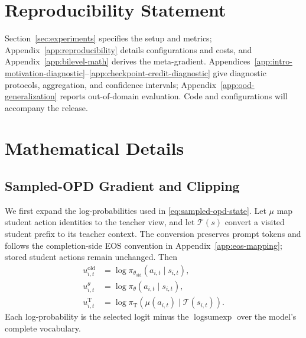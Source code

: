 \documentclass{article}
\theoremstyle{plain}
\theoremstyle{definition}
\theoremstyle{remark}
\begin{document}
\section*{Reproducibility Statement}

Section~\ref{sec:experiments} specifies the setup and metrics; Appendix~\ref{app:reproducibility}
details configurations and costs, and Appendix~\ref{app:bilevel-math} derives the meta-gradient.
Appendices~\ref{app:intro-motivation-diagnostic}--\ref{app:checkpoint-credit-diagnostic}
give diagnostic protocols, aggregation, and confidence intervals;
Appendix~\ref{app:ood-generalization} reports out-of-domain evaluation.
Code and configurations will accompany the release.




\newpage
\appendix




\section{Mathematical Details}
\label{app:mathematical-details}

\subsection{Sampled-OPD Gradient and Clipping}
\label{app:sampled-opd-math}

We first expand the log-probabilities used in \cref{eq:sampled-opd-state}. Let \(\mu\) map student action identities to the teacher view, and let \(\mathcal T(s)\) convert a visited student prefix to its teacher context. The conversion preserves prompt tokens and follows the completion-side EOS convention in Appendix~\ref{app:eos-mapping}; stored student actions remain unchanged. Then
\begin{equation}
\begin{aligned}
    u^{\mathrm{old}}_{i,t}
    &=\log\pi_{\theta_{\mathrm{old}}}(a_{i,t}\mid s_{i,t}),\\
    u^\theta_{i,t}
    &=\log\pi_\theta(a_{i,t}\mid s_{i,t}),\\
    u^{\mathrm T}_{i,t}
    &=\log\pi_{\mathrm T}\!\left(\mu(a_{i,t})\mid\mathcal T(s_{i,t})\right).
\end{aligned}
\label{eq:aligned-action-log-probs}
\end{equation}
Each log-probability is the selected logit minus the \(\operatorname{logsumexp}\) over the model's complete vocabulary.
\end{document}
